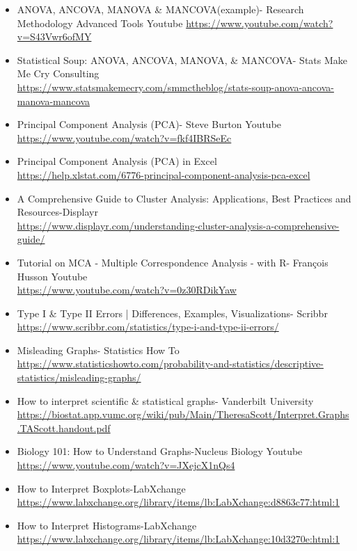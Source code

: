 \documentclass{article}
\begin{document}
\begin{itemize}
    \item ANOVA, ANCOVA, MANOVA \& MANCOVA(example)- Research Methodology Advanced Tools Youtube \url{https://www.youtube.com/watch?v=S43Vwr6ofMY}
    \item Statistical Soup: ANOVA, ANCOVA, MANOVA, \& MANCOVA- Stats Make Me Cry Consulting \\
    \url{https://www.statsmakemecry.com/smmctheblog/stats-soup-anova-ancova-manova-mancova}
    \item Principal Component Analysis (PCA)- Steve Burton Youtube\\
    \url{https://www.youtube.com/watch?v=fkf4IBRSeEc}
    \item Principal Component Analysis (PCA) in Excel \\
    \url{https://help.xlstat.com/6776-principal-component-analysis-pca-excel}
    \item A Comprehensive Guide to Cluster Analysis: Applications, Best Practices and Resources-Displayr \\
    \url{https://www.displayr.com/understanding-cluster-analysis-a-comprehensive-guide/}
    \item Tutorial on MCA - Multiple Correspondence Analysis - with R- François Husson Youtube \\
    \url{https://www.youtube.com/watch?v=0z30RDikYaw}
    \item Type I \& Type II Errors | Differences, Examples, Visualizations- Scribbr \\
    \url{https://www.scribbr.com/statistics/type-i-and-type-ii-errors/}
    \item Misleading Graphs- Statistics How To \\
    \url{https://www.statisticshowto.com/probability-and-statistics/descriptive-statistics/misleading-graphs/}
    \item How to interpret scientific \& statistical graphs- Vanderbilt University \\    \url{https://biostat.app.vumc.org/wiki/pub/Main/TheresaScott/Interpret.Graphs.TAScott.handout.pdf}
    \item Biology 101: How to Understand Graphs-Nucleus Biology Youtube \\
    \url{https://www.youtube.com/watch?v=JXejcX1nQs4}
    \item How to Interpret Boxplots-LabXchange\\
\url{https://www.labxchange.org/library/items/lb:LabXchange:d8863c77:html:1}
    \item How to Interpret Histograms-LabXchange\\ \url{https://www.labxchange.org/library/items/lb:LabXchange:10d3270e:html:1}

\end{itemize}
\end{document}
